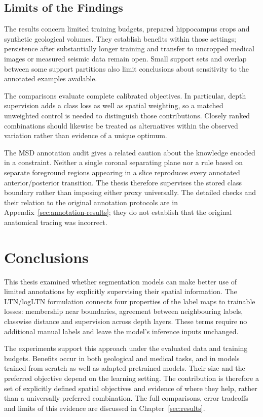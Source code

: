 \documentclass[12pt,a4paper]{article}
\begin{document}
\FloatBarrier
\subsection{Limits of the Findings}
\label{sec:limitations}\label{sec:experimental-limitations}

The results concern limited training budgets, prepared hippocampus crops
and synthetic geological volumes. They establish benefits within those
settings; persistence after substantially longer training and transfer
to uncropped medical images or measured seismic data remain open.
Small support sets and overlap between some support partitions also
limit conclusions about sensitivity to the annotated examples available.

The comparisons evaluate complete calibrated objectives. In particular,
depth supervision adds a class loss as well as spatial weighting, so
a matched unweighted control is needed to distinguish those contributions.
Closely ranked combinations should likewise be treated as alternatives
within the observed variation rather than evidence of a unique optimum.

The MSD annotation audit gives a related caution about the knowledge encoded
in a constraint. Neither a single coronal separating plane nor a rule based
on separate foreground regions appearing in a slice reproduces every
annotated anterior/posterior transition. The thesis therefore supervises the
stored class boundary rather than imposing either proxy universally. The
detailed checks and their relation to the original annotation protocols are
in Appendix~\ref{sec:annotation-results}; they do not establish that the
original anatomical tracing was incorrect.

\clearpage

\section{Conclusions}\label{sec:conclusions}

This thesis examined whether segmentation models can make better use of
limited annotations by explicitly supervising their spatial information.
The LTN/logLTN formulation connects four properties of the label maps to
trainable losses: membership near boundaries, agreement between
neighbouring labels, classwise distance and supervision across depth
layers. These terms require no additional manual labels and leave the
model's inference inputs unchanged.

The experiments support this approach under the evaluated data and
training budgets. Benefits occur in both geological and medical tasks,
and in models trained from scratch as well as adapted pretrained models.
Their size and the preferred objective depend on the learning setting.
The contribution is therefore a set of explicitly defined spatial
objectives and evidence of where they help, rather than a universally
preferred combination. The full comparisons, error tradeoffs and limits
of this evidence are discussed in Chapter~\ref{sec:results}.
\end{document}
